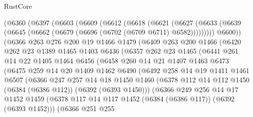 \begin{lexlean}{RustCore}
\begin{coremodule}
    (@6360
      (@6397
        (@6603
          (@6609
            (@6612
              (@6618
                (@6621
                  (@6627
                    (@6633 (@6639 (@6645 (@6662 (@6679 (@6696 (@6702 (@6709 @6711) @6582)))))))))
                @6600))
            (@6366
              @263
              @276
              @200
              @19
              @1466
              @1479
              (@6409
                @263
                @200
                @1466
                (@6420
                  @262
                  @23
                  @1389
                  @1465
                  @1403
                  @6436
                  (@6357
                    @262
                    @23
                    @1465
                    (@6441
                      @261
                      @14
                      @22
                      @1405
                      @1464
                      @6456
                      (@6458
                        @260
                        @14
                        @21
                        @1407
                        @1463
                        @6473
                        (@6475
                          @259
                          @14
                          @20
                          @1409
                          @1462
                          @6490
                          (@6492
                            @258
                            @14
                            @19
                            @1411
                            @1461
                            @6507
                            (@6366
                              @247
                              @257
                              @14
                              @18
                              @1450
                              @1460
                              (@6378 @112 @14 @112 @1450 (@6384 (@6386 @112)) (@6392 (@6393 @1450)))
                              (@6366
                                @249
                                @256
                                @14
                                @17
                                @1452
                                @1459
                                (@6378
                                  @117
                                  @14
                                  @117
                                  @1452
                                  (@6384 (@6386 @117))
                                  (@6392 (@6393 @1452)))
                                (@6366
                                  @251
                                  @255

\end{coremodule}
\end{lexlean}
